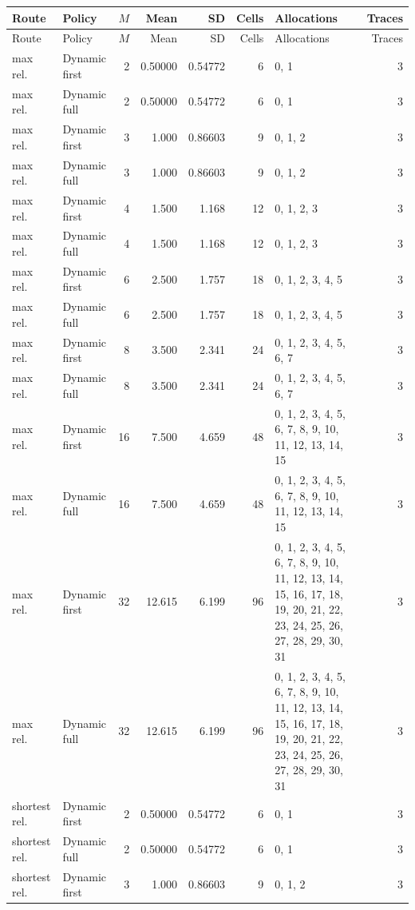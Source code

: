 \documentclass[10pt,a4paper]{article}
\begin{document}
\tiny\setlength{\tabcolsep}{2pt}\begin{longtable}{@{}p{23mm}p{29mm}rrrrp{36mm}r@{}}
\toprule Route & Policy & $M$ & Mean & SD & Cells & Allocations & Traces \\ \midrule\endfirsthead
\toprule Route & Policy & $M$ & Mean & SD & Cells & Allocations & Traces \\ \midrule\endhead
\bottomrule\endfoot
max rel. & Dynamic first & 2 & 0.50000 & 0.54772 & 6 & 0, 1 & 3 \\
max rel. & Dynamic full & 2 & 0.50000 & 0.54772 & 6 & 0, 1 & 3 \\
max rel. & Dynamic first & 3 & 1.000 & 0.86603 & 9 & 0, 1, 2 & 3 \\
max rel. & Dynamic full & 3 & 1.000 & 0.86603 & 9 & 0, 1, 2 & 3 \\
max rel. & Dynamic first & 4 & 1.500 & 1.168 & 12 & 0, 1, 2, 3 & 3 \\
max rel. & Dynamic full & 4 & 1.500 & 1.168 & 12 & 0, 1, 2, 3 & 3 \\
max rel. & Dynamic first & 6 & 2.500 & 1.757 & 18 & 0, 1, 2, 3, 4, 5 & 3 \\
max rel. & Dynamic full & 6 & 2.500 & 1.757 & 18 & 0, 1, 2, 3, 4, 5 & 3 \\
max rel. & Dynamic first & 8 & 3.500 & 2.341 & 24 & 0, 1, 2, 3, 4, 5, 6, 7 & 3 \\
max rel. & Dynamic full & 8 & 3.500 & 2.341 & 24 & 0, 1, 2, 3, 4, 5, 6, 7 & 3 \\
max rel. & Dynamic first & 16 & 7.500 & 4.659 & 48 & 0, 1, 2, 3, 4, 5, 6, 7, 8, 9, 10, 11, 12, 13, 14, 15 & 3 \\
max rel. & Dynamic full & 16 & 7.500 & 4.659 & 48 & 0, 1, 2, 3, 4, 5, 6, 7, 8, 9, 10, 11, 12, 13, 14, 15 & 3 \\
max rel. & Dynamic first & 32 & 12.615 & 6.199 & 96 & 0, 1, 2, 3, 4, 5, 6, 7, 8, 9, 10, 11, 12, 13, 14, 15, 16, 17, 18, 19, 20, 21, 22, 23, 24, 25, 26, 27, 28, 29, 30, 31 & 3 \\
max rel. & Dynamic full & 32 & 12.615 & 6.199 & 96 & 0, 1, 2, 3, 4, 5, 6, 7, 8, 9, 10, 11, 12, 13, 14, 15, 16, 17, 18, 19, 20, 21, 22, 23, 24, 25, 26, 27, 28, 29, 30, 31 & 3 \\
shortest rel. & Dynamic first & 2 & 0.50000 & 0.54772 & 6 & 0, 1 & 3 \\
shortest rel. & Dynamic full & 2 & 0.50000 & 0.54772 & 6 & 0, 1 & 3 \\
shortest rel. & Dynamic first & 3 & 1.000 & 0.86603 & 9 & 0, 1, 2 & 3 \\

\end{longtable}
\end{document}
